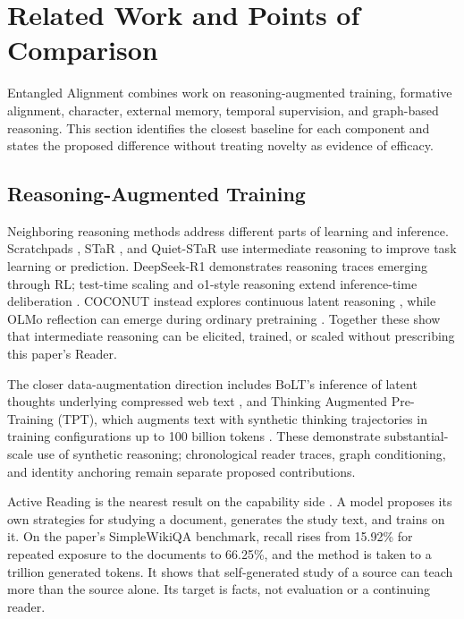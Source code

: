 \documentclass[11pt]{article}
\begin{document}
		\section{Related Work and Points of Comparison}\label{sec:related-work}

Entangled Alignment combines work on reasoning-augmented training, formative
alignment, character, external memory, temporal supervision, and graph-based
reasoning. This section identifies the closest baseline for each component and
states the proposed difference without treating novelty as evidence of efficacy.

\subsection{Reasoning-Augmented Training}

Neighboring reasoning methods address different parts of learning and inference. Scratchpads \cite{nye2021scratchpads}, STaR
\cite{zelikman2022star}, and Quiet-STaR \cite{zelikman2024quietstar} use
intermediate reasoning to improve task learning or prediction. DeepSeek-R1
\cite{deepseek2025r1} demonstrates reasoning traces emerging through RL;
test-time scaling and o1-style reasoning extend inference-time deliberation
\cite{snell2024scaling,openai2024o1}. COCONUT instead explores continuous latent
reasoning \cite{hao2024coconut}, while OLMo reflection can emerge during
ordinary pretraining \cite{rethinkingreflection2025}. Together these show that
intermediate reasoning can be elicited, trained, or scaled without prescribing
this paper's Reader.

The closer data-augmentation direction includes BoLT's inference of latent
thoughts underlying compressed web text \cite{ruan2025bolt}, and Thinking
Augmented Pre-Training (TPT), which augments text with synthetic thinking
trajectories in training configurations up to 100 billion tokens
\cite{nvidia2025tpt}. These demonstrate substantial-scale use of synthetic
reasoning; chronological reader traces, graph conditioning, and identity
anchoring remain separate proposed contributions.

Active Reading is the nearest result on the capability side
\cite{lin2025activereading}. A model proposes its own strategies for studying a
document, generates the study text, and trains on it. On the paper's
SimpleWikiQA benchmark, recall rises from 15.92\% for repeated exposure to the
documents to 66.25\%, and the method is taken to a trillion generated tokens.
It shows that self-generated study of a source can teach more than the source
alone. Its target is facts, not evaluation or a continuing reader.
\end{document}

